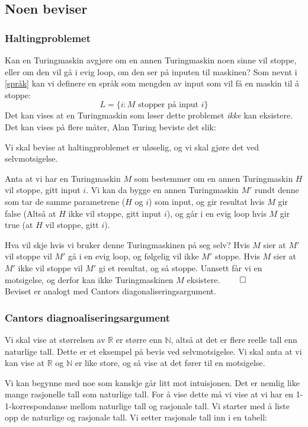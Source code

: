 \subsection{Noen beviser}
\subsubsection{Haltingproblemet}
Kan en Turingmaskin avgjøre om en annen Turingmaskin noen sinne vil stoppe, eller om den vil gå i evig loop, om den ser på inputen til maskinen? Som nevnt i \ref{språk} kan vi definere en språk som mengden av input som vil få en maskin til å stoppe:
\[ L = \{i : M \text{ stopper på input } i \} \]
Det kan vises at en Turingmaskin som løser dette problemet \emph{ikke} kan eksistere. Det kan vises på flere måter, Alan Turing beviste det slik:

\label{haltingProof}
Vi skal bevise at haltingproblemet er uløselig, og vi skal gjøre det ved selvmotsigelse. 

Anta at vi har en Turingmaskin $ M $ som bestemmer om en annen Turingmaskin $ H $ vil stoppe, gitt input $ i $. Vi kan da bygge en annen Turingmaskin $ M' $ rundt denne som tar de samme parametrene ($ H $ og $ i $) som input, og gir resultat hvis $ M $ gir false (Altså at $ H $ ikke vil stoppe, gitt input $ i $), og går i en evig loop hvis $ M $ gir true (at $ H $ vil stoppe, gitt $ i $). 

Hva vil skje hvis vi bruker denne Turingmaskinen på seg selv? Hvis $ M $ sier at $ M' $ vil stoppe vil $ M' $ gå i en evig loop, og følgelig vil ikke $ M' $ stoppe. Hvis $ M $ sier at $ M' $ ikke vil stoppe vil $ M' $ gi et resultat, og så stoppe. Uansett får vi en motsigelse, og derfor kan ikke Turingmaskinen $ M $ eksistere. $ \hfill\qed $ \\

\noindent Beviset er analogt med Cantors diagonaliseringsargument.

\subsubsection{Cantors diagnoaliseringsargument}
Vi skal vise at størrelsen av $ \mathbb{R} $ er større enn $ \mathbb{N} $, altså at det er flere reelle tall enn naturlige tall. Dette er et eksempel på bevis ved selvmotsigelse. Vi skal anta at vi kan vise at $ \mathbb{R} $ og $ \mathbb{N} $ er like store, og så vise at det fører til en motsigelse.

Vi kan begynne med noe som kanskje går litt mot intuisjonen. Det er nemlig like mange rasjonelle tall som naturlige tall. For å vise dette må vi vise at vi har en 1-1-korrespondanse mellom naturlige tall og rasjonale tall. Vi starter med å liste opp  de naturlige og rasjonale tall. Vi setter rasjonale tall inn i en tabell:


